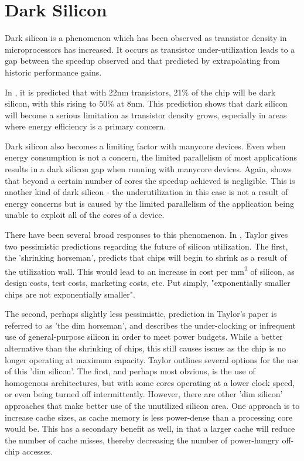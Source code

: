 \documentclass{UoYCSproject}
\begin{document}
\section{Dark Silicon}

Dark silicon is a phenomenon which has been observed as transistor density in microprocessors has increased.
It occurs as transistor under-utilization leads to a gap between the speedup observed and that predicted by
extrapolating from historic performance gains.

In \cite{darksilicon}, it is predicted that with 22nm transistors, 21\% of the chip will be dark silicon,
with this rising to 50\% at 8nm. This prediction shows that dark silicon will become a serious limitation
as transistor density grows, especially in areas where energy efficiency is a primary concern.

Dark silicon also becomes a limiting factor with manycore devices. Even when energy consumption is not a
concern, the limited parallelism of most applications results in a dark silicon gap when running with
manycore devices. Again, \cite{darksilicon} shows that beyond a certain number of cores the speedup achieved
is negligible. This is another kind of dark silicon - the underutilization in this case is not a result of
energy concerns but is caused by the limited parallelism of the application being unable to exploit all of
the cores of a device.

There have been several broad responses to this phenomenon.
In \cite{four-horsemen}, Taylor gives two pessimistic predictions regarding the future of silicon
utilization. The first, the 'shrinking horseman', predicts that chips will begin to shrink as a result of
the utilization wall. This would lead to an increase in cost per mm\textsuperscript{2} of silicon, as
design costs, test costs, marketing costs, etc. Put simply, "exponentially smaller chips are not
exponentially smaller".

The second, perhaps slightly less pessimistic, prediction in Taylor's paper
is referred to as 'the dim horseman', and describes the under-clocking or infrequent use of
general-purpose silicon in order to meet power budgets. While a better alternative than the shrinking
of chips, this still causes issues as the chip is no longer operating at maximum capacity.
Taylor outlines several options for the use of this 'dim silicon'. The first, and perhaps most obvious,
is the use of homogenous architectures, but with some cores operating at a lower clock speed, or
even being turned off intermittently. However, there are other 'dim silicon' approaches that make better
use of the unutilized silicon area. One approach is to increase cache sizes, as cache memory is less
power-dense than a processing core would be. This has a secondary benefit as well, in that a larger
cache will reduce the number of cache misses, thereby decreasing the number of power-hungry off-chip
accesses.
\end{document}
